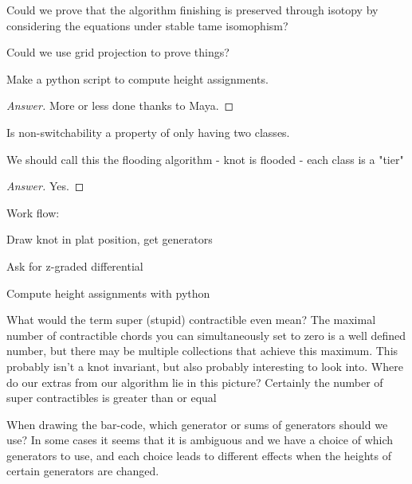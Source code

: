 \documentclass[General-Information/Most_recent_log(3_0).tex]{subfiles}
\begin{document}
\begin{question}
Could we prove that the algorithm finishing is preserved through isotopy by considering the equations under stable tame isomophism?
\end{question}

\begin{question}
Could we use grid projection to prove things?
\end{question}

\begin{question}
Make a python script to compute height assignments.
\end{question}
\begin{proof}[Answer]
    More or less done thanks to Maya.
\end{proof}

\begin{question}
Is non-switchability a property of only having two classes.
\end{question}

\begin{question}
We should call this the flooding algorithm - knot is flooded  - each class is a "tier" 
\end{question}
\begin{proof}[Answer]
    Yes.
\end{proof}

\begin{question}

Work flow:



Draw knot in plat position, get generators

Ask for z-graded differential

Compute height assignments with python

\end{question}

\begin{question}
    What would the term super (stupid) contractible even mean? The maximal number of contractible chords you can simultaneously set to zero is a well defined number, but there may be multiple collections that achieve this maximum. This probably isn't a knot invariant, but also probably interesting to look into. Where do our extras from our algorithm lie in this picture? Certainly the number of super contractibles is greater than or equal
\end{question}

\begin{question}
    When drawing the bar-code, which generator or sums of generators should we use? In some cases it seems that it is ambiguous and we have a choice of which generators to use, and each choice leads to different effects when the heights of certain generators are changed.
\end{question}
\end{document}
